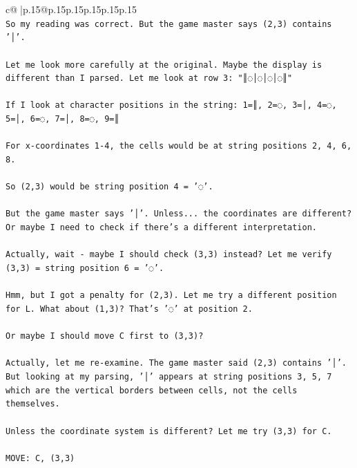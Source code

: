 \documentclass{article}
\begin{document}
{\begin{supertabular}{c@{$\;$}|p{.15\linewidth}@{}p{.15\linewidth}p{.15\linewidth}p{.15\linewidth}p{.15\linewidth}p{.15\linewidth}}
{{{\\ 
\texttt{So my reading was correct. But the game master says (2,3) contains '│'. } \\
\\ 
\texttt{Let me look more carefully at the original. Maybe the display is different than I parsed. Let me look at row 3: "║◌│◌│◌│◌║"} \\
\\ 
\texttt{If I look at character positions in the string: 1=║, 2=◌, 3=│, 4=◌, 5=│, 6=◌, 7=│, 8=◌, 9=║} \\
\\ 
\texttt{For x{-}coordinates 1{-}4, the cells would be at string positions 2, 4, 6, 8.} \\
\\ 
\texttt{So (2,3) would be string position 4 = '◌'.} \\
\\ 
\texttt{But the game master says '│'. Unless... the coordinates are different? Or maybe I need to check if there's a different interpretation.} \\
\\ 
\texttt{Actually, wait {-} maybe I should check (3,3) instead? Let me verify (3,3) = string position 6 = '◌'.} \\
\\ 
\texttt{Hmm, but I got a penalty for (2,3). Let me try a different position for L. What about (1,3)? That's '◌' at position 2.} \\
\\ 
\texttt{Or maybe I should move C first to (3,3)?} \\
\\ 
\texttt{Actually, let me re{-}examine. The game master said (2,3) contains '│'. But looking at my parsing, '│' appears at string positions 3, 5, 7 which are the vertical borders between cells, not the cells themselves.} \\
\\ 
\texttt{Unless the coordinate system is different? Let me try (3,3) for C.} \\
\\ 
\texttt{MOVE: C, (3,3)} \\
            }
        }
    }
     \\ \\


\end{supertabular}}
\end{document}
